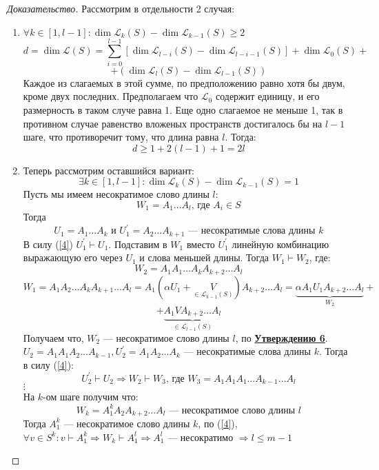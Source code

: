 \documentclass[a4paper, 14pt]{extarticle}
\theoremstyle{definition}
\begin{document}
\begin{proof}[Доказательство]
	Рассмотрим в отдельности 2 случая:
	\begin{enumerate}
		\item \(\forall k \in [1, l - 1] : \operatorname{dim} \mathcal{L}_k(S) - \operatorname{dim} \mathcal{L}_{k - 1}(S) \geqslant 2\)
		\[d = \operatorname{dim} \mathcal{L}(S) = \sum\limits_{i = 0}^{l - 1} \left[\operatorname{dim} \mathcal{L}_{l - i}(S) - \operatorname{dim} \mathcal{L}_{l - i - 1}(S) \right] + \operatorname{dim} \mathcal{L}_{0}(S) + \]
		\[+ (\operatorname{dim} \mathcal{L}_l (S) - \operatorname{dim} \mathcal{L}_{l - 1}(S))\]
		Каждое из слагаемых в этой сумме, по предположению равно хотя бы двум, кроме двух последних. Предполагаем что \(\mathcal{L}_0\) содержит единицу, и его размерность в таком случе равна 1. Еще одно слагаемое не меньше 1, так в противном случае равенство вложеных пространств достигалось бы на \(l - 1\) шаге, что противоречит тому, что длина равна \(l\). Тогда:
		\[d \geqslant 1 + 2(l - 1) + 1 = 2l\]
		
		\item Теперь рассмотрим оставшийся вариант:
		\[\exists k \in [1, l - 1] : \operatorname{dim} \mathcal{L}_k(S) - \operatorname{dim} \mathcal{L}_{k - 1}(S) = 1 \label{4}\tag{4}\]
		Пусть мы имеем несократимое слово длины \(l\):
		\[W_1 = A_1 \dots A_l \text{, где } A_i \in S\]
		Тогда
		\[U_1 = A_1 \dots A_k \text{ и } U^{\prime}_1 = A_2 \dots A_{k + 1} \text{ --- несократимые слова длины } k\]
		В силу (\ref{4}) \(U_1^{\prime} \vdash U_1\). Подставим в \(W_1\) вместо \(U_1^{\prime}\) линейную комбинацию выражающую его через \(U_1\) и слова меньшей длины. Тогда \(W_1 \vdash W_2\), где:
		\[W_2 = A_1A_1 \dots A_k A_{k + 2} \dots A_l\]
		\[W_1 = A_1A_2 \dots A_{k}A_{k + 1} \dots A_l = A_1 (\alpha U_1 + \underset{\in \mathcal{L}_{k - 1}(S)}{V})A_{k + 2} \dots A_l = \underbrace{\alpha A_1 U_1 A_{k + 2} \dots A_l}_{W_2} +\]
		\[+ \underbrace{A_1 V A_{k + 2} \dots A_{l}}_{\in \mathcal{L}_{l - 1}(S)}\]
		Получаем что, \(W_2\) --- несократимое слово длины \(l\), по \hyperref[st7_2]{\textbf{Утверждению 6}}.\\
		\(U_2 = A_1A_1A_2 \dots A_{k - 1}, U_2^{\prime} = A_1A_2 \dots A_{k}\) --- несократимые слова длины \(k\). Тогда в силу (\ref{4}):
		\[U_2^{\prime} \vdash U_2 \Rightarrow W_2 \vdash W_3 \text{, где } W_3 = A_1A_1A_1 \dots A_{k - 1} \dots A_{l}\]
		\(\vdots\)\\
		На \(k\)-ом шаге получим что:
		\[W_k = A_1^k A_2 A_{k + 2} \dots A_l \text{ --- несократимое слово длины } l\]
		Тогда \(A_1^k\) --- несократимое слово длины \(k\), по (\ref{4}), \(\forall v \in S^k : v \vdash A_1^k \Rightarrow W_k \vdash A^{l}_1 \Rightarrow A_1^l\) --- несократимо \(\Rightarrow l \leqslant m - 1\)
	\end{enumerate}
\end{proof}
\end{document}

